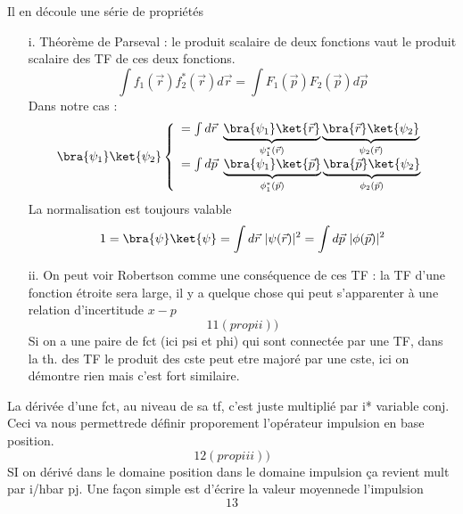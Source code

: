 		
		Il en découle une série de propriétés
		\begin{itemize}
		\item[i.] Théorème de Parseval : le produit scalaire de deux fonctions vaut le produit scalaire 
		des TF de ces deux fonctions. 
		\begin{equation}
		\int f_1(\vec{r})f_2^*(\vec{r}) d\vec{r} = \int F_1(\vec{p})F_2(\vec{p})d\vec{p}
		\end{equation}
		Dans notre cas :
		\begin{equation}
		\bra{\psi_1}\ket{\psi_2} \left\{\begin{array}{ll}
		= \int d\vec{r}\ \underbrace{\bra{\psi_1}\ket{\vec{r}}}_{\psi_1^*(\vec{r})}
		\underbrace{\bra{\vec{r}}\ket{\psi_2}}_{\psi_2(\vec{r})}\\
		= \int d\vec{p}\ \underbrace{\bra{\psi_1}\ket{\vec{p}}}_{\phi_1^*(\vec{p})}
		\underbrace{\bra{\vec{p}}\ket{\psi_2}}_{\phi_2(\vec{p})}		
		\end{array}\right.
		\end{equation}
		La normalisation est toujours valable
		\begin{equation}
		1 = \bra{\psi}\ket{\psi} = \int d\vec{r}\ |\psi(\vec{r})|^2 = \int d\vec{p}\ |\phi(\vec{p})|^2
		\end{equation}
		
		\item[ii.] On peut voir Robertson comme une conséquence de ces TF : la TF d'une fonction étroite 
		sera large, il y a quelque chose qui peut s'apparenter à une relation d'incertitude $x-p$
		\begin{equation}
		11 (prop ii) )
		\end{equation}
		Si on a une paire de fct (ici psi et phi) qui sont connectée par une TF, dans la th. des TF le 
		produit des cste peut etre majoré par une cste, ici on démontre rien mais c'est fort similaire.\\

		\end{itemize}
		
		
		
		



La dérivée d'une fct, au niveau de sa tf, c'est juste multiplié par i* variable conj. Ceci va 
nous permettrede définir proporement l'opérateur impulsion en base position.
\begin{equation}
12 (prop iii) )
\end{equation}
SI on dérivé dans le domaine position dans le domaine impulsion ça revient  mult par i/hbar pj. Une 
façon simple est d'écrire la valeur moyennede l'impulsion
\begin{equation}
13
\end{equation}